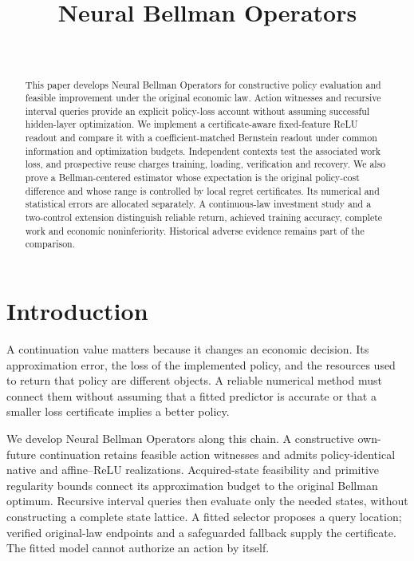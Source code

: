 \documentclass[ecta,nameyear,draft]{econsocart}
\begin{document}
\begin{frontmatter}
\title{Neural Bellman Operators}
\begin{aug}
\author[id=au1,addressref={add1}]{~}
\address[id=add1]{Peking University}
\end{aug}
\begin{abstract}
This paper develops Neural Bellman Operators for constructive policy evaluation and feasible improvement under the original economic law. Action witnesses and recursive interval queries provide an explicit policy-loss account without assuming successful hidden-layer optimization. We implement a certificate-aware fixed-feature ReLU readout and compare it with a coefficient-matched Bernstein readout under common information and optimization budgets. Independent contexts test the associated work loss, and prospective reuse charges training, loading, verification and recovery. We also prove a Bellman-centered estimator whose expectation is the original policy-cost difference and whose range is controlled by local regret certificates. Its numerical and statistical errors are allocated separately. A continuous-law investment study and a two-control extension distinguish reliable return, achieved training accuracy, complete work and economic noninferiority. Historical adverse evidence remains part of the comparison.
\end{abstract}
\begin{keyword}
\end{keyword}
\end{frontmatter}
\section{Introduction}\label{sec:introduction67}
A continuation value matters because it changes an economic decision. Its approximation error, the loss of the implemented policy, and the resources used to return that policy are different objects. A reliable numerical method must connect them without assuming that a fitted predictor is accurate or that a smaller loss certificate implies a better policy.

We develop Neural Bellman Operators along this chain. A constructive own-future continuation retains feasible action witnesses and admits policy-identical native and affine--ReLU realizations. Acquired-state feasibility and primitive regularity bounds connect its approximation budget to the original Bellman optimum. Recursive interval queries then evaluate only the needed states, without constructing a complete state lattice. A fitted selector proposes a query location; verified original-law endpoints and a safeguarded fallback supply the certificate. The fitted model cannot authorize an action by itself.
\end{document}
